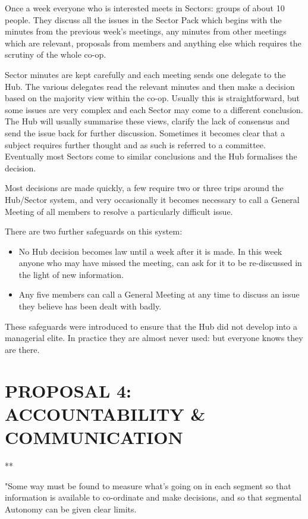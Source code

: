 Once a week everyone who is interested meets in Sectors: groups of about 10 people. They discuss all the issues in the Sector Pack which begins with the minutes from the previous week's meetings, any minutes from other meetings which are relevant, proposals from members and anything else which requires the scrutiny of the whole co-op.

Sector minutes are kept carefully and each meeting sends one delegate to the Hub. The various delegates read the relevant minutes and then make a decision based on the majority view within the co-op. Usually this is straightforward, but some issues are very complex and each Sector may come to a different conclusion. The Hub will usually summarise these views, clarify the lack of consensus and send the issue back for further discussion. Sometimes it becomes clear that a subject requires further thought and as such is referred to a committee. Eventually most Sectors come to similar conclusions and the Hub formalises the decision.

Most decisions are made quickly, a few require two or three trips around the Hub/Sector system, and very occasionally it becomes necessary to call a General Meeting of all members to resolve a particularly difficult issue.

There are two further safeguards on this system:

\begin{itemize}
  \item No Hub decision becomes law until a week after it is made. In this week anyone who may have missed the meeting, can ask for it to be re-discussed in the light of new information.

  \item Any five members can call a General Meeting at any time to discuss an issue they believe has been dealt with badly.

\end{itemize}

These safeguards were introduced to ensure that the Hub did not develop into a managerial elite. In practice they are almost never used: but everyone knows they are there.

\section*{PROPOSAL 4: ACCOUNTABILITY \& COMMUNICATION}
**

"Some way must be found to measure what's going on in each segment so that information is available to co-ordinate and make decisions, and so that segmental Autonomy can be given clear limits.

